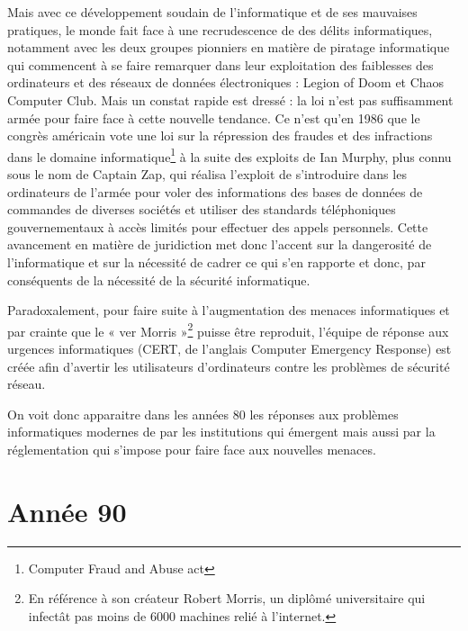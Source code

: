 \documentclass[a4paper]{memoir}
\begin{document}
Mais avec ce développement soudain de l'informatique et de ses mauvaises pratiques, le monde fait face à une recrudescence de des délits informatiques, notamment avec les deux groupes pionniers en matière de piratage informatique qui commencent à se faire remarquer dans leur exploitation des faiblesses des ordinateurs et des réseaux de données électroniques : Legion of Doom et Chaos Computer Club. Mais un constat rapide est dressé : la loi n'est pas suffisamment armée pour faire face à cette nouvelle tendance. Ce n'est qu'en 1986 que le congrès américain vote une loi sur la répression des fraudes et des infractions dans le domaine informatique\footnote{Computer Fraud and Abuse act} à la suite des exploits de Ian Murphy, plus connu sous le nom de Captain Zap, qui réalisa l'exploit de s'introduire dans les ordinateurs de l'armée pour voler des informations des bases de données de commandes de diverses sociétés et utiliser des standards téléphoniques gouvernementaux à accès limités pour effectuer des appels personnels. 
Cette avancement en matière de juridiction met donc l'accent sur la dangerosité de l'informatique et sur la nécessité de cadrer ce qui s'en rapporte et donc, par conséquents de la nécessité de la sécurité informatique.

Paradoxalement, pour faire suite à l'augmentation des menaces informatiques et par crainte que le « ver Morris »\footnote{En référence à son créateur Robert Morris, un diplômé universitaire qui infectât pas moins de 6000 machines relié à l'internet.} puisse être reproduit, l'équipe de réponse aux urgences informatiques (CERT, de l'anglais Computer Emergency Response) est créée afin d'avertir les utilisateurs d'ordinateurs contre les problèmes de sécurité réseau.

On voit donc apparaitre dans les années 80 les réponses aux problèmes informatiques modernes de par les institutions qui émergent mais aussi par la réglementation qui s'impose pour faire face aux nouvelles menaces.

\section{Année 90}
\end{document}
